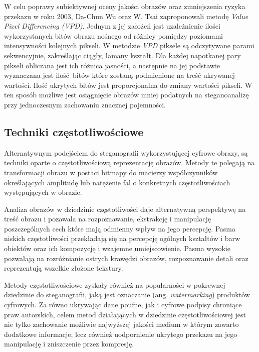 {{{            %
            W celu poprawy subiektywnej oceny jakości obrazów oraz zmniejszenia ryzyka przekazu w roku 2003, Da-Chun Wu
            oraz  W. Tsai zaproponowali metodę \textit{Value Pixel Differencing (VPD)}. Jednym z jej założeń jest
            uzależnienie  ilości wykorzystanych bitów obrazu nośnego od różnicy pomiędzy poziomami intensywności
            kolejnych  pikseli\cite{Wu2003ASM}. W metodzie \textit{VPD} piksele są odczytywane parami sekwencyjnie,
            zakreślając ciągły,  łamany kształt. Dla każdej napotkanej pary pikseli obliczana jest ich różnica jasności,
            a następnie na jej  podstawie wyznaczana jest ilość bitów które zostaną podmienione na treść ukrywanej
            wartości. Ilość ukrytych  bitów jest proporcjonalna do zmiany wartości pikseli. W ten sposób możliwe jest
            osiągnięcie obrazów mniej  podatnych na steganoanalizę przy jednoczesnym zachowaniu znacznej
            pojemności\cite{Wu2003ASM}.

        }

        \subsection{Techniki częstotliwościowe}
        {
            Alternatywnym podejściem do steganografii wykorzystującej cyfrowe obrazy, są techniki oparte o
            częstotliwościową reprezentację obrazów. Metody te polegają na transformacji obrazu w postaci bitmapy do
            macierzy współczynników określających amplitudę lub natężenie fal o konkretnych częstotliwościach
            występujących w obrazie\cite{ImageCompressionDCT, Reichel2001IntegerWT}.

            Analiza obrazów w dziedzinie częstotliwości daje alternatywną perspektywę na treść obrazu i pozawala na
            rozpoznawanie, ekstrakcję i manipulację poszczególnych cech które mają odmienny wpływ na jego percepcję.
            Pasma niskich częstotliwości przekładają się na percepcję ogólnych kształtów i barw obiektów oraz ich
            kompozycję i wzajemne umiejscowienie. Pasma wysokie pozwalają na rozróżnianie ostrych krawędzi obrazów,
            rozpoznawanie detali oraz reprezentują wszelkie złożone tekstury\cite{ImageSpatialFreq}.

            Metody częstotliwościowe zyskały również na popularności w pokrewnej dziedzinie do steganografii, jaką jest
            oznaczanie (ang. \textit{watermarking}) produktów cyfrowych. Za równo ukrywając dane poufne, jak i cyfrowe
            podpisy chroniące praw autorskich, celem metod działających w dziedzinie częstotliwościowej jest nie tylko
            zachowanie możliwie najwyższej jakości medium w którym zawarto dodatkowe informacje, lecz również
            uodpornienie ukrytego przekazu na jego manipulację i zniszczenie przez kompresję\cite{Tao2014RobustIW}.

}}}
